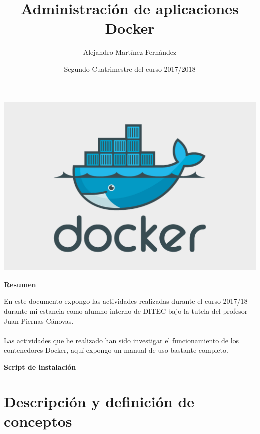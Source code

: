 \documentclass[]{article}
\title{Administración de aplicaciones Docker}
\author{Alejandro Martínez Fernández}
\date{Segundo Cuatrimestre del curso 2017/2018}
\begin{document}
\begin{titlepage}
	\maketitle
	\begin{center}
		\includegraphics[scale=0.35]{logo.png}
	\end{center}
\end{titlepage}
\tableofcontents

\newpage
\begin{center}
	\bf Resumen
\end{center}
En este documento expongo las actividades realizadas durante el curso 2017/18 durante mi estancia como alumno interno de DITEC bajo la tutela del profesor Juan Piernas Cánovas.
\\\\Las actividades que he realizado han sido investigar el funcionamiento de los contenedores Docker, aquí expongo un manual de uso bastante completo.
\\
\begin{center}
	\bf Script de instalación
\end{center}





\newpage
\section{Descripción y definición de conceptos}

\vspace{3mm}
\end{document}
